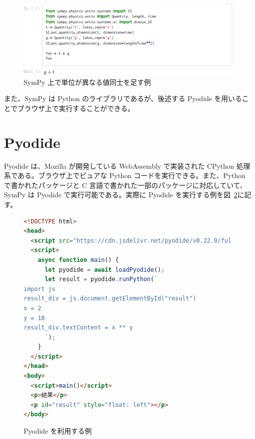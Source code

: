 \begin{figure}[t]
\centering
\includegraphics[width=\linewidth]{work/sympy_unit_example-crop.pdf}
\caption{SymPy 上で単位が異なる値同士を足す例} \label{sympy_unit_example}
\end{figure}

また、SymPy は Python のライブラリであるが、後述する Pyodide を用いることでブラウザ上で実行することができる。

\section{Pyodide}
Pyodide は、Mozilla が開発している WebAssembly で実装された CPython 処理系である。ブラウザ上でピュアな Python コードを実行できる。また、Python で書かれたパッケージと C 言語で書かれた一部のパッケージに対応していて、SymPy は Pyodide で実行可能である。実際に Pyodide を実行する例を図~\ref{pyodide_example}に記す。

\begin{figure}[h]
\centering
\begin{lstlisting}[language=html]
<!DOCTYPE html>
<head>
  <script src="https://cdn.jsdelivr.net/pyodide/v0.22.0/full/pyodide.js"></script>
  <script>
    async function main() {
      let pyodide = await loadPyodide();
      let result = pyodide.runPython(`
import js
result_div = js.document.getElementById("result")
x = 2
y = 10
result_div.textContent = x ** y
      `);
    }
  </script>
</head>
<body>
  <script>main()</script>
  <p>結果</p>
  <p id="result" style="float: left"></p>
</body>
\end{lstlisting}
\caption{Pyodide を利用する例} \label{pyodide_example}
\end{figure}


